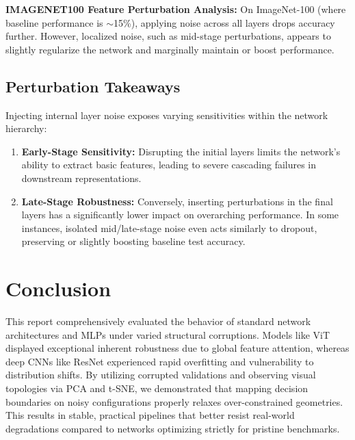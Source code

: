 \documentclass[12pt,a4paper]{article}
\begin{document}
\textbf{IMAGENET100 Feature Perturbation Analysis:} On ImageNet-100 (where baseline performance is $\sim$15\%), applying noise across all layers drops accuracy further. However, localized noise, such as mid-stage perturbations, appears to slightly regularize the network and marginally maintain or boost performance.


\subsection{Perturbation Takeaways}
Injecting internal layer noise exposes varying sensitivities within the network hierarchy:
\begin{enumerate}
    \item \textbf{Early-Stage Sensitivity:} Disrupting the initial layers limits the network's ability to extract basic features, leading to severe cascading failures in downstream representations.
    \item \textbf{Late-Stage Robustness:} Conversely, inserting perturbations in the final layers has a significantly lower impact on overarching performance. In some instances, isolated mid/late-stage noise even acts similarly to dropout, preserving or slightly boosting baseline test accuracy.
\end{enumerate}

\section{Conclusion}
This report comprehensively evaluated the behavior of standard network architectures and MLPs under varied structural corruptions. Models like ViT displayed exceptional inherent robustness due to global feature attention, whereas deep CNNs like ResNet experienced rapid overfitting and vulnerability to distribution shifts. By utilizing corrupted validations and observing visual topologies via PCA and t-SNE, we demonstrated that mapping decision boundaries on noisy configurations properly relaxes over-constrained geometries. This results in stable, practical pipelines that better resist real-world degradations compared to networks optimizing strictly for pristine benchmarks.
\end{document}
